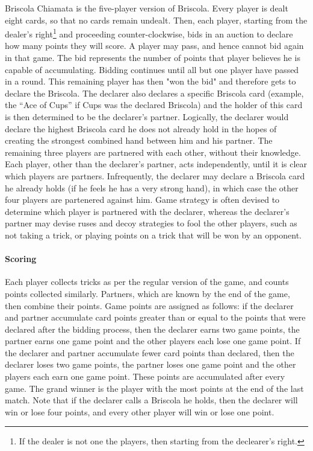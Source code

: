 \documentclass[a4paper]{article}
\begin{document}
Briscola Chiamata is the five-player version of Briscola. Every player is dealt eight cards, so that no cards remain undealt. Then, each player, starting from the dealer's right\footnote{If the dealer is not one the players, then starting from the declearer's right.} and proceeding counter-clockwise, bids in an auction to declare how many points they will score. A player may pass, and hence cannot bid again in that game. The bid represents the number of points that player believes he is capable of accumulating. Bidding continues until all but one player have passed in a round. This remaining player has then "won the bid" and therefore gets to declare the Briscola. The declarer also declares a specific Briscola card (example, the ``Ace of Cups'' if Cups was the declared Briscola) and the holder of this card is then determined to be the declarer's partner. Logically, the declarer would declare the highest Briscola card he does not already hold in the hopes of creating the strongest combined hand between him and his partner.
The remaining three players are partnered with each other, without their knowledge. Each player, other than the declarer's partner, acts independently, until it is clear which players are partners. Infrequently, the declarer may declare a Briscola card he already holds (if he feels he has a very strong hand), in which case the other four players are partenered against him.
Game strategy is often devised to determine which player is partnered with the declarer, whereas the declarer's partner may devise ruses and decoy strategies to fool the other players, such as not taking a trick, or playing points on a trick that will be won by an opponent.

\paragraph{Scoring}

Each player collects tricks as per the regular version of the game, and counts points collected similarly. Partners, which are known by the end of the game, then combine their points. Game points are assigned as follows: if the declarer and partner accumulate card points greater than or equal to the points that were declared after the bidding process, then the declarer earns two game points, the partner earns one game point and the other players each lose one game point. If the declarer and partner accumulate fewer card points than declared, then  the declarer loses two game points, the partner loses one game point and the other players each earn one game point. These points are accumulated after every game. The grand winner is the player with the most points at the end of the last match. Note that if the declarer calls a Briscola he holds, then the declarer will win or lose four points, and every other player will win or lose one point.
\end{document}
